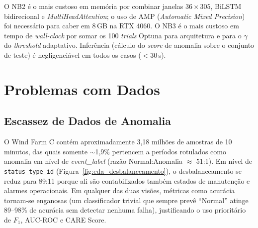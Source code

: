 \documentclass[12pt]{article}
\begin{document}
\begin{table}[!ht]
\centering
\small
{}
\caption{Custo computacional estimado por \textit{notebook} (GPU NVIDIA RTX A6000, 48\,GB).}
\label{tab:custo_comp}
\end{table}

O NB2 é o mais custoso em memória por combinar janelas $36 \times 305$, BiLSTM bidirecional e \textit{MultiHeadAttention}; o uso de AMP (\textit{Automatic Mixed Precision}) foi necessário para caber em 8\,GB na RTX 4060. O NB3 é o mais custoso em tempo de \textit{wall-clock} por somar os 100 \textit{trials} Optuna para arquitetura e para o $\gamma$ do \textit{threshold} adaptativo. Inferência (cálculo do \textit{score} de anomalia sobre o conjunto de teste) é negligenciável em todos os casos ($<$30\,s).

\section{Problemas com Dados}\label{sec:problemas-dados}

\subsection{Escassez de Dados de Anomalia}

O Wind Farm C contém aproximadamente 3,18 milhões de amostras de 10 minutos, das quais somente $\sim$1,9\% pertencem a períodos rotulados como anomalia em nível de \textit{event\_label} (razão Normal:Anomalia $\approx$ 51:1). Em nível de \texttt{status\_type\_id} (Figura~\ref{fig:eda_desbalanceamento}), o desbalanceamento se reduz para 89:11 porque ali são contabilizados também estados de manutenção e alarmes operacionais. Em qualquer das duas visões, métricas como acurácia tornam-se enganosas (um classificador trivial que sempre prevê ``Normal'' atinge 89--98\% de acurácia sem detectar nenhuma falha), justificando o uso prioritário de $F_1$, AUC-ROC e CARE Score.
\end{document}
